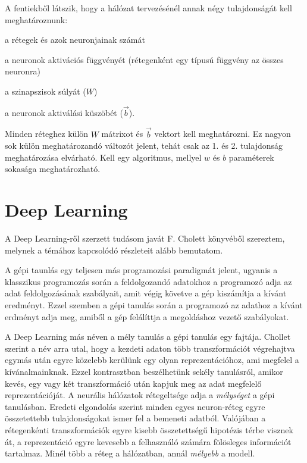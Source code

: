 A fentiekből látszik, hogy a hálózat tervezésénél annak négy tulajdonságát kell meghatároznunk:
\begin{enumerate*}
	\item a rétegek és azok neuronjainak számát
	\item a neuronok aktivációs függvényét (rétegenként egy típusú függvény az összes neuronra)
	\item a szinapszisok súlyát ($W$)
	\item a neuronok aktiválási küszöbét ($\vec{b}$).
\end{enumerate*}
Minden réteghez külön $W$ mátrixot és $\vec{b}$ vektort kell meghatározni. Ez nagyon sok külön meghatározandó változót jelent, tehát csak az 1. és 2. tulajdonság meghatározása elvárható. Kell egy algoritmus, mellyel $w$ és $b$ paraméterek sokasága meghatározható. %

\section{Deep Learning}
A Deep Learning-ről szerzett tudásom javát F. Cholett könyvéből\cite{Chollet} szereztem, melynek a témához kapcsolódó részleteit alább bemutatom.

A gépi taunlás egy teljesen más programozási paradigmát jelent, ugyanis a klasszikus programozás során a feldolgozandó adatokhoz a programozó adja az adat feldolgozásának szabályait, amit végig követve a gép kiszámítja a kívánt eredményt. Ezzel szemben a gépi tanulás során a programozó az adathoz  a kívánt erdményt adja meg, amiből a gép felálíttja a megoldáshoz vezető szabályokat.%

A Deep Learning más néven a mély tanulás a gépi tanulás egy fajtája. Chollet szerint a név arra utal, hogy a kezdeti adaton több transzformációt végrehajtva egymás után egyre közelebb kerülünk egy olyan reprezentációhoz, ami megfelel a kívánalmainknak. Ezzel kontrasztban beszélhetünk sekély tanulásról, amikor kevés, egy vagy két transzformáció után kapjuk meg az adat megfelelő reprezentációját.%
A neurális hálózatok rétegeltsége adja a \emph{mélységet} a gépi tanulásban. Eredeti elgondolás szerint minden egyes neuron-réteg egyre összetettebb tulajdonságokat ismer fel a bemeneti adatból. Valójában a rétegenkénti transzformációk egyre kisebb összetettségű hipotézis térbe visznek át, a reprezentáció egyre kevesebb a felhasználó számára fölösleges információt tartalmaz. Minél több a réteg a hálózatban, annál \emph{mélyebb} a modell.

